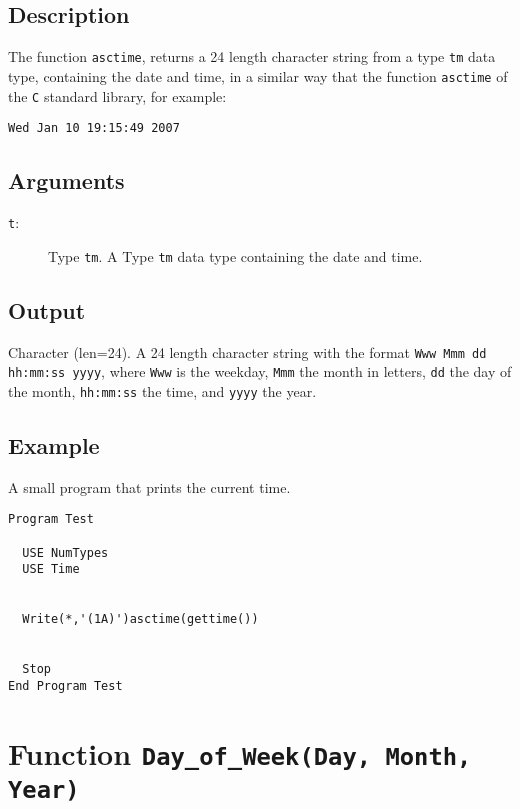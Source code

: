 \subsection{Description}

The function \texttt{asctime}, returns a 24 length character string
from a type \texttt{tm} data type, containing the date and time, in a
similar way that the function \texttt{asctime} of the \texttt{C}
standard library, for example:
\begin{verbatim}
Wed Jan 10 19:15:49 2007
\end{verbatim}

\subsection{Arguments}

\begin{description}
\item[\texttt{t}: ] Type \texttt{tm}. A Type \texttt{tm} data type
  containing the date and time.
\end{description}

\subsection{Output}

Character (len=24). A 24 length character string with the format
\texttt{Www Mmm dd hh:mm:ss yyyy}, where \texttt{Www} is the weekday,
\texttt{Mmm} the month in letters, \texttt{dd} the day of the month,
\texttt{hh:mm:ss} the time, and \texttt{yyyy} the year. 

\subsection{Example}

A small program that prints the current time.

\begin{lstlisting}[emph=asctime,
                   emphstyle=\color{blue},
                   frame=trBL,
                   caption=Printing current date/time.,
                   label=asctime]
Program Test

  USE NumTypes
  USE Time


  Write(*,'(1A)')asctime(gettime())


  Stop
End Program Test
\end{lstlisting}

\section{Function \texttt{Day\_of\_Week(Day, Month, Year)}}

